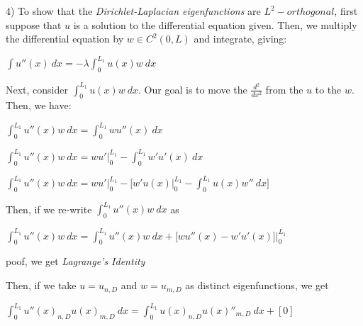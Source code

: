 \documentclass[executivepaper]{article}
\begin{document}
\begin{flushleft}

4) To show that the \textit{Dirichlet-Laplacian eigenfunctions} are $L^2-orthogonal$, first suppose that $u$ is a solution to the differential equation given. Then, we multiply the differential equation by $w \in C^2(0,L)$ and integrate, giving:

\begin{center}

$\int u''(x) \ dx=-\lambda \int_{0}^{L_{1}} u(x)w \ dx$

\end{center}

Next, consider $\int_{0}^{L_{1}} u(x)w \ dx$. Our goal is to move the $\frac{d^2}{dx^2}$ from the $u$ to the $w$. Then, we have:

\begin{center}

$\int_{0}^{L_{1}} u''(x)w \ dx=\int_{0}^{L_{1}} wu''(x) \ dx$

\vspace{2mm}

$\int_{0}^{L_{1}} u''(x)w \ dx=wu' \Big|_0^{L_{1}} - \int_{0}^{L_{1}} w'u'(x) \ dx$

\vspace{2mm}

$\int_{0}^{L_{1}} u''(x)w \ dx=wu' \Big|_0^{L_{1}} - \bigg[ w'u(x) \Big|_0^{L_{1}} - \int_{0}^{L_{1}} u(x)w'' \ dx \bigg]$

\end{center}

Then, if we re-write $\int_{0}^{L_{1}} u''(x)w \ dx$ as 

\begin{center}

$\int_{0}^{L_{1}} u''(x)w \ dx=\int_{0}^{L_{1}} u''(x)w \ dx + \bigg[wu''(x)-w'u'(x)\bigg]\Big|_0^{L_{1}}$

\end{center}

poof, we get \textit{Lagrange's Identity}

\vspace{3mm}

Then, if we take $u=u_{n,D}$ and $w=u_{m,D}$ as distinct eigenfunctions, we get

\pagebreak

\vspace*{-40mm}

\begin{center}

$\int_{0}^{L_{1}} u''(x)_{n,D} u(x)_{m,D} \ dx=\int_{0}^{L_{1}} u(x)_{n,D} u(x)''_{m,D} \ dx + [0]$


\end{center}
\end{flushleft}
\end{document}
